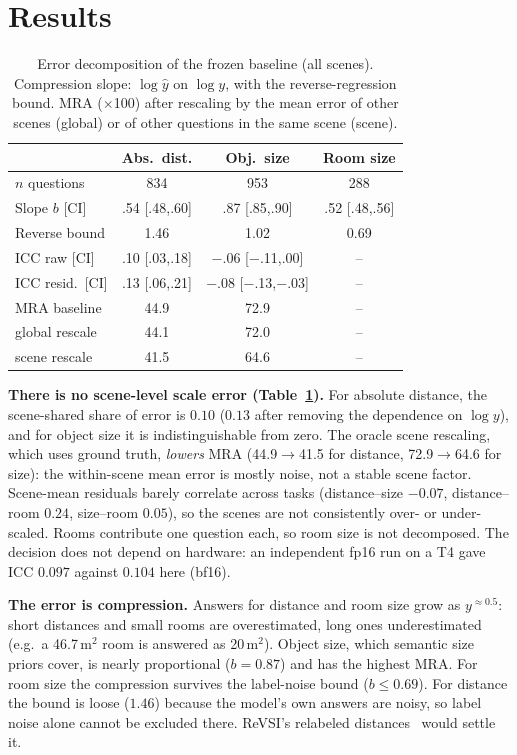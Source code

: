 \documentclass[10pt,twocolumn,letterpaper]{article}
\begin{document}
\section{Results}\label{sec:results}
\begin{table}[t]
\centering\small
\caption{Error decomposition of the frozen baseline (all scenes). Compression slope: $\log\hat y$ on $\log y$,
with the reverse-regression bound. MRA ($\times$100) after rescaling by the mean error of other scenes (global)
or of other questions in the same scene (scene).}
\label{tab:decomp}
\setlength{\tabcolsep}{3pt}
\begin{tabular}{lccc}
\toprule
 & Abs.\ dist. & Obj.\ size & Room size \\
\midrule
$n$ questions & 834 & 953 & 288 \\
Slope $b$ [CI] & .54 [.48,.60] & .87 [.85,.90] & .52 [.48,.56] \\
Reverse bound & 1.46 & 1.02 & 0.69 \\
ICC raw [CI] & .10 [.03,.18] & $-$.06 [$-$.11,.00] & -- \\
ICC resid.\ [CI] & .13 [.06,.21] & $-$.08 [$-$.13,$-$.03] & -- \\
MRA baseline & 44.9 & 72.9 & -- \\
\quad global rescale & 44.1 & 72.0 & -- \\
\quad scene rescale & 41.5 & 64.6 & -- \\
\bottomrule
\end{tabular}
\end{table}

\textbf{There is no scene-level scale error (Table~\ref{tab:decomp}).} For absolute distance, the scene-shared
share of error is $0.10$ ($0.13$ after removing the dependence on $\log y$), and for object size it is indistinguishable from zero.
The oracle scene rescaling, which uses ground truth, \emph{lowers} MRA (44.9$\to$41.5 for distance, 72.9$\to$64.6 for size):
the within-scene mean error is mostly noise, not a stable scene factor. Scene-mean residuals barely correlate across
tasks (distance--size $-0.07$, distance--room $0.24$, size--room $0.05$), so the scenes are not consistently
over- or under-scaled. Rooms contribute one question each, so room size is not decomposed.
The decision does not depend on hardware: an independent fp16 run on a T4 gave ICC $0.097$ against $0.104$ here (bf16).

\textbf{The error is compression.} Answers for distance and room size grow as $y^{\approx 0.5}$: short distances
and small rooms are overestimated, long ones underestimated (e.g.\ a 46.7\,m$^2$ room is answered as 20\,m$^2$).
Object size, which semantic size priors cover, is nearly proportional ($b{=}0.87$) and has the highest MRA.
For room size the compression survives the label-noise bound ($b\le0.69$). For distance the bound is
loose ($1.46$) because the model's own answers are noisy, so label noise alone cannot be excluded there.
ReVSI's relabeled distances~\cite{revsi} would settle it.
\end{document}
